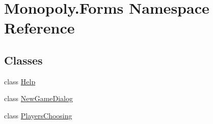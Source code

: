 \hypertarget{namespace_monopoly_1_1_forms}{}\section{Monopoly.\+Forms Namespace Reference}
\label{namespace_monopoly_1_1_forms}
\subsection*{Classes}
\begin{DoxyCompactItemize}
\item 
class \mbox{\hyperlink{class_monopoly_1_1_forms_1_1_help}{Help}}
\item 
class \mbox{\hyperlink{class_monopoly_1_1_forms_1_1_new_game_dialog}{New\+Game\+Dialog}}
\item 
class \mbox{\hyperlink{class_monopoly_1_1_forms_1_1_players_choosing}{Players\+Choosing}}
\end{DoxyCompactItemize}

